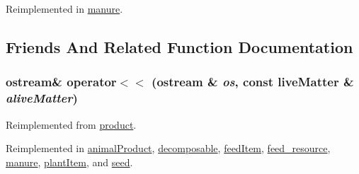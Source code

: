 Reimplemented in \hyperlink{classmanure_a1bfcf202c765d99c51fb8ed6850e21a2}{manure}.

\subsection{Friends And Related Function Documentation}
\hypertarget{classlive_matter_a694b548b571c88f71f2c7cc75b47d0fb}{
\subsubsection[{operator$<$$<$}]{\setlength{\rightskip}{0pt plus 5cm}ostream\& operator$<$$<$ (ostream \& {\em os}, \/  const {\bf liveMatter} \& {\em aliveMatter})}}
\label{classlive_matter_a694b548b571c88f71f2c7cc75b47d0fb}


Reimplemented from \hyperlink{classproduct_a1b6bf2f2c82a18a17907ee1192fd94bb}{product}.

Reimplemented in \hyperlink{classanimal_product_abeaab9718f6e5b0d6ab31bff4fd06032}{animalProduct}, \hyperlink{classdecomposable_a44e65cd8ff15e859dba4d1bfd1003c98}{decomposable}, \hyperlink{classfeed_item_ab4c308e0864a941e9652ae997df1142c}{feedItem}, \hyperlink{classfeed__resource_aac858c94a22c316b401e81352546407e}{feed\_\-resource}, \hyperlink{classmanure_a88bca29dfcbb79bbe0a8a0ea33186fcc}{manure}, \hyperlink{classplant_item_a57bdf6a52f37049686a779f3c93ecc73}{plantItem}, and \hyperlink{classseed_addebb9c9bc7ceb6fadd6d3a86be76168}{seed}.

